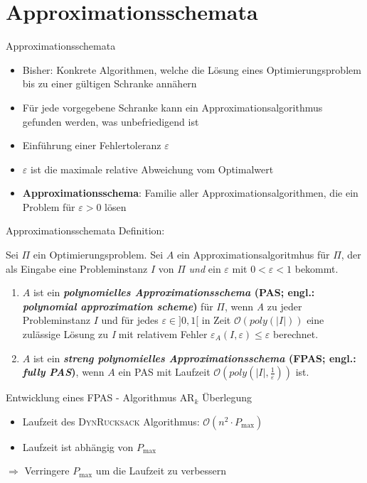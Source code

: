 \section{Approximationsschemata}
\begin{frame}{Approximationsschemata}


\begin{itemize}
\item Bisher: Konkrete Algorithmen, welche die Lösung eines Optimierungsproblem bis zu einer gültigen Schranke annähern
\item Für jede vorgegebene Schranke kann ein Approximationsalgorithmus gefunden werden, was unbefriedigend ist
\pause
\item Einführung einer Fehlertoleranz $\varepsilon$
\item $\varepsilon$ ist die maximale relative Abweichung vom Optimalwert
\item \textbf{Approximationsschema}: Familie aller Approximationsalgorithmen, die ein Problem für $\varepsilon > 0$ lösen
\end{itemize}
\end{frame}

\begin{frame}{Approximationsschemata}	
    Definition:
			
Sei $\Pi$ ein Optimierungsproblem. Sei $A$ ein Approximationsalgoritmhus für $\Pi$, der als Eingabe eine Probleminstanz $I$ von $\Pi$ \textit{und} ein $\varepsilon$ mit $0 < \varepsilon < 1$ bekommt.

\begin{enumerate}
\item
$A$ ist ein \textbf{\textit{polynomielles Approximationsschema} (PAS; engl.: \textit{polynomial approximation scheme})} für $\Pi$, wenn \textit{A} zu jeder Probleminstanz $I$ und für jedes $\varepsilon \in ] 0,1 [$ in Zeit $\mathcal O(poly(|I|))$ eine zulässige Lösung zu \textit{I} mit relativem Fehler $\varepsilon_A(\textit{I},\varepsilon) \le \varepsilon$ berechnet.

\item
$A$ ist ein \textbf{\textit{streng polynomielles Approximationsschema} (FPAS; engl.: \textit{fully PAS})}, wenn $A$ ein PAS mit Laufzeit $\mathcal O(poly(|I|, \frac{1}{\varepsilon}))$ ist.

\end{enumerate}		      
\end{frame}

\begin{frame}{Entwicklung eines FPAS - Algorithmus $\text{AR}_k$ Überlegung}	
	\begin{itemize}
		\item 
		Laufzeit des \textsc{DynRucksack} Algorithmus: $\mathcal O(n^2 \cdot P_{\max})$ 
		\item
		Laufzeit ist abhängig von $P_{\max}$
	\end{itemize}
	$\Rightarrow$ Verringere $P_{\max}$ um die Laufzeit zu verbessern
\end{frame}


